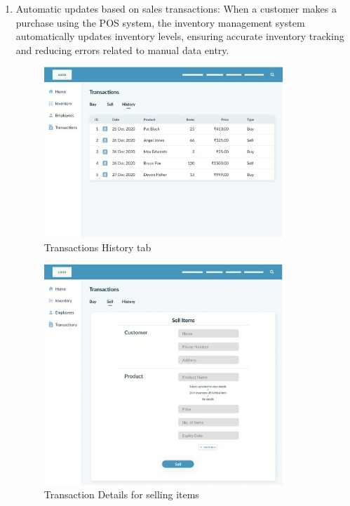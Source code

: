 \begin{enumerate}
    \item Automatic updates based on sales transactions: When a customer makes a purchase using the POS system, the inventory management system automatically updates inventory levels, ensuring accurate inventory tracking and reducing errors related to manual data entry.

    \begin{figure}[H]
  \centering
   \includegraphics[width=9cm]{Figures/Figma7.jpeg}
  \caption{Transactions History tab}
\label{}
\end{figure}

\begin{figure}[H]
  \centering
   \includegraphics[width=9cm]{Figures/Figma8.jpeg}
  \caption{Transaction Details for selling items}
\label{}
\end{figure}


\end{enumerate}
